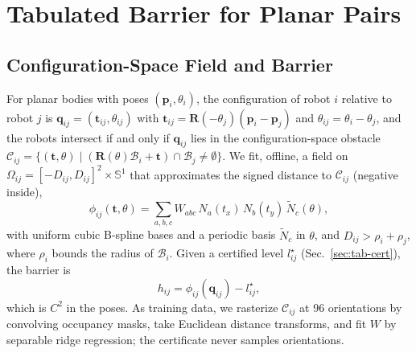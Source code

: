\documentclass[journal]{IEEEtran}
\theoremstyle{definition}
\newcommand{\Sone}{\mathbb{S}^1}
\newcommand{\CO}{\mathcal{C}}
\newcommand{\Rot}{\mathbf{R}}
\begin{document}
\section{Tabulated Barrier for Planar Pairs}\label{sec:tab}

\subsection{Configuration-Space Field and Barrier}
For planar bodies with poses $(\mathbf p_i,\theta_i)$, the configuration of robot $i$ relative to
robot $j$ is $\mathbf q_{ij}=(\mathbf t_{ij},\theta_{ij})$ with
$\mathbf t_{ij}=\Rot(-\theta_j)(\mathbf p_i-\mathbf p_j)$ and $\theta_{ij}=\theta_i-\theta_j$, and
the robots intersect if and only if $\mathbf q_{ij}$ lies in the configuration-space obstacle
$\CO_{ij}=\{(\mathbf t,\theta)\mid(\Rot(\theta)\mathcal B_i+\mathbf t)\cap\mathcal B_j\neq\emptyset\}$.
We fit, offline, a field on $\Omega_{ij}=[-D_{ij},D_{ij}]^2\times\Sone$ that approximates the signed
distance to $\CO_{ij}$ (negative inside),
\begin{equation}\label{eq:field}
\phi_{ij}(\mathbf t,\theta)=\textstyle\sum_{a,b,c}W_{abc}\,N_a(t_x)\,N_b(t_y)\,\tilde N_c(\theta),
\end{equation}
with uniform cubic B-spline bases and a periodic basis $\tilde N_c$ in $\theta$, and
$D_{ij}>\rho_i+\rho_j$, where $\rho_i$ bounds the radius of $\mathcal B_i$. Given a certified level
$l^\star_{ij}$ (Sec.~\ref{sec:tab-cert}), the barrier is
\begin{equation}\label{eq:h}
h_{ij}=\phi_{ij}(\mathbf q_{ij})-l^\star_{ij},
\end{equation}
which is $C^2$ in the poses. As training data, we rasterize $\CO_{ij}$ at 96 orientations by
convolving occupancy masks, take Euclidean distance transforms, and fit $W$ by separable ridge
regression; the certificate never samples orientations.
\end{document}
